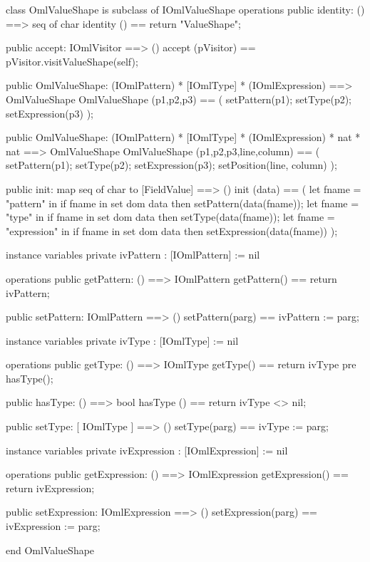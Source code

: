 \begin{vdm_al}
class OmlValueShape is subclass of IOmlValueShape
operations
  public identity: () ==> seq of char
  identity () == return "ValueShape";

  public accept: IOmlVisitor ==> ()
  accept (pVisitor) == pVisitor.visitValueShape(self);

  public OmlValueShape:
    (IOmlPattern) *
    [IOmlType] *
    (IOmlExpression) ==> OmlValueShape
  OmlValueShape (p1,p2,p3) == 
    ( setPattern(p1);
      setType(p2);
      setExpression(p3) );

  public OmlValueShape:
    (IOmlPattern) *
    [IOmlType] *
    (IOmlExpression) *
    nat *
    nat ==> OmlValueShape
  OmlValueShape (p1,p2,p3,line,column) == 
    ( setPattern(p1);
      setType(p2);
      setExpression(p3);
      setPosition(line, column) );

  public init: map seq of char to [FieldValue] ==> ()
  init (data) ==
    ( let fname = "pattern" in
        if fname in set dom data
        then setPattern(data(fname));
      let fname = "type" in
        if fname in set dom data
        then setType(data(fname));
      let fname = "expression" in
        if fname in set dom data
        then setExpression(data(fname)) );

instance variables
  private ivPattern : [IOmlPattern] := nil

operations
  public getPattern: () ==> IOmlPattern
  getPattern() == return ivPattern;

  public setPattern: IOmlPattern ==> ()
  setPattern(parg) == ivPattern := parg;

instance variables
  private ivType : [IOmlType] := nil

operations
  public getType: () ==> IOmlType
  getType() == return ivType
    pre hasType();

  public hasType: () ==> bool
  hasType () == return ivType <> nil;

  public setType: [ IOmlType ] ==> ()
  setType(parg) == ivType := parg;

instance variables
  private ivExpression : [IOmlExpression] := nil

operations
  public getExpression: () ==> IOmlExpression
  getExpression() == return ivExpression;

  public setExpression: IOmlExpression ==> ()
  setExpression(parg) == ivExpression := parg;

end OmlValueShape
\end{vdm_al}

